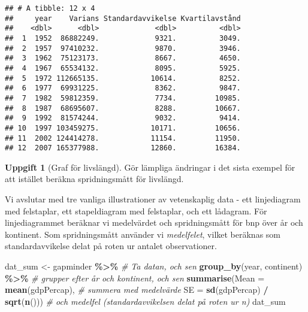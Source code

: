 \documentclass[
]{book}
\newenvironment{Shaded}{\begin{snugshade}}{\end{snugshade}}
\newcommand{\AttributeTok}[1]{\textcolor[rgb]{0.13,0.29,0.53}{#1}}
\newcommand{\CommentTok}[1]{\textcolor[rgb]{0.56,0.35,0.01}{\textit{#1}}}
\newcommand{\FunctionTok}[1]{\textcolor[rgb]{0.13,0.29,0.53}{\textbf{#1}}}
\newcommand{\NormalTok}[1]{#1}
\newcommand{\OtherTok}[1]{\textcolor[rgb]{0.56,0.35,0.01}{#1}}
\newcommand{\SpecialCharTok}[1]{\textcolor[rgb]{0.81,0.36,0.00}{\textbf{#1}}}
\theoremstyle{definition}
\theoremstyle{definition}
\theoremstyle{definition}
\newtheorem{exercise}{Uppgift}[chapter]
\theoremstyle{definition}
\theoremstyle{remark}
\begin{document}
\begin{verbatim}
## # A tibble: 12 x 4
##     year    Varians Standardavvikelse Kvartilavstånd
##    <dbl>      <dbl>             <dbl>          <dbl>
##  1  1952  86882249.             9321.          3049.
##  2  1957  97410232.             9870.          3946.
##  3  1962  75123173.             8667.          4650.
##  4  1967  65534132.             8095.          5925.
##  5  1972 112665135.            10614.          8252.
##  6  1977  69931225.             8362.          9847.
##  7  1982  59812359.             7734.         10985.
##  8  1987  68695607.             8288.         10667.
##  9  1992  81574244.             9032.          9414.
## 10  1997 103459275.            10171.         10656.
## 11  2002 124414278.            11154.         11950.
## 12  2007 165377988.            12860.         16384.
\end{verbatim}

\begin{exercise}[Graf för livslängd]
Gör lämpliga ändringar i det sista exempel för att istället beräkna spridningsmått för livslängd.
\end{exercise}

Vi avslutar med tre vanliga illustrationer av vetenskaplig data - ett linjediagram med felstaplar, ett stapeldiagram med felstaplar, och ett lådagram. För linjediagrammet beräknar vi medelvärdet och spridningsmått för bnp över år och kontinent. Som spridningsmått använder vi \emph{medelfelet}, vilket beräknas som standardavvikelse delat på roten ur antalet observationer.

\begin{Shaded}
\begin{Highlighting}[]
\NormalTok{dat\_sum }\OtherTok{\textless{}{-}}\NormalTok{ gapminder }\SpecialCharTok{\%\textgreater{}\%}                         \CommentTok{\# Ta datan, och sen}
  \FunctionTok{group\_by}\NormalTok{(year, continent) }\SpecialCharTok{\%\textgreater{}\%}                  \CommentTok{\# grupper efter år och kontinent, och sen}
  \FunctionTok{summarise}\NormalTok{(}\AttributeTok{Mean =} \FunctionTok{mean}\NormalTok{(gdpPercap),              }\CommentTok{\# summera med medelvärde}
            \AttributeTok{SE =} \FunctionTok{sd}\NormalTok{(gdpPercap) }\SpecialCharTok{/} \FunctionTok{sqrt}\NormalTok{(}\FunctionTok{n}\NormalTok{()))      }\CommentTok{\# och medelfel (standardavvikelsen delat på roten ur n)}
\NormalTok{dat\_sum}
\end{Highlighting}
\end{Shaded}
\end{document}
